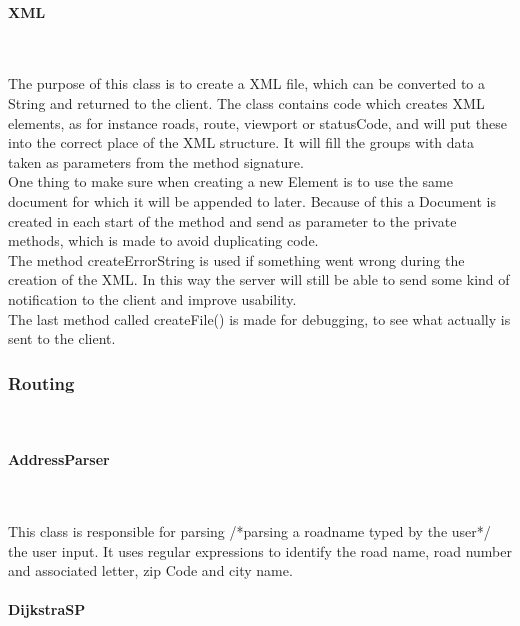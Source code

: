 \documentclass[a4paper,10pt,titlepage]{article}
\begin{document}
				
				\paragraph{XML}\mbox{}\
				
The purpose of this class is to create a XML file, which can be converted to a String and returned to the client. The class contains code which creates XML elements, as for instance roads, route, viewport or statusCode, and will put these into the correct place of the XML structure. It will fill the groups with data taken as parameters from the method signature. \\
One thing to make sure when creating a new Element is to use the same document for which it will be appended to later. Because of this a Document is created in each start of the method and send as parameter to the private methods, which is made to avoid duplicating code.\\
The method createErrorString is used if something went wrong during the creation of the XML. In this way the server will still be able to send some kind of notification to the client and improve usability.\\
The last method called createFile() is made for debugging, to see what actually is sent to the client.\\


				
			\subsubsection{Routing}\
			
				\paragraph{AddressParser}\mbox{}\
				
This class is responsible for parsing /*parsing a roadname typed by the user*/ the user input. It uses regular expressions to identify the road name, road number and associated letter, zip Code and city name.
				
				\paragraph{DijkstraSP}\mbox{}\
				
\end{document}
